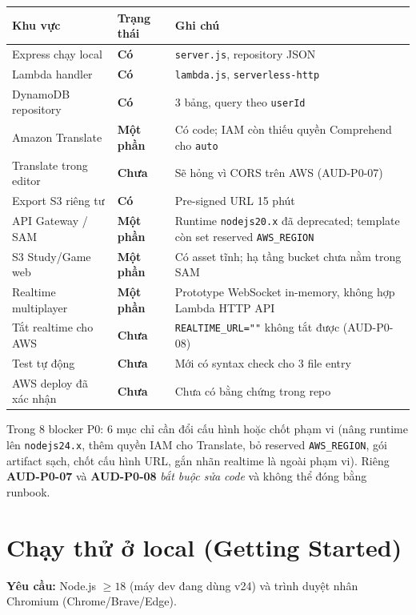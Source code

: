 \documentclass[11pt,a4paper]{article}
\newcommand{\code}[1]{\texttt{#1}}
\newcommand{\tagok}{\textcolor{ok}{\textbf{Có}}}
\newcommand{\tagno}{\textcolor{bad}{\textbf{Chưa}}}
\newcommand{\tagpart}{\textcolor{warn}{\textbf{Một phần}}}
\begin{document}
\begin{longtable}{@{}p{6.6cm} p{2.4cm} p{5.4cm}@{}}
\toprule
\textbf{Khu vực} & \textbf{Trạng thái} & \textbf{Ghi chú} \\
\midrule
\endhead
Express chạy local & \tagok & \code{server.js}, repository JSON \\
Lambda handler & \tagok & \code{lambda.js}, \code{serverless-http} \\
DynamoDB repository & \tagok & 3 bảng, query theo \code{userId} \\
Amazon Translate & \tagpart & Có code; IAM còn thiếu quyền Comprehend cho \code{auto} \\
Translate trong editor & \tagno & Sẽ hỏng vì CORS trên AWS (AUD-P0-07) \\
Export S3 riêng tư & \tagok & Pre-signed URL 15 phút \\
API Gateway / SAM & \tagpart & Runtime \code{nodejs20.x} đã deprecated; template còn set reserved \code{AWS_REGION} \\
S3 Study/Game web & \tagpart & Có asset tĩnh; hạ tầng bucket chưa nằm trong SAM \\
Realtime multiplayer & \tagpart & Prototype WebSocket in-memory, không hợp Lambda HTTP API \\
Tắt realtime cho AWS & \tagno & \code{REALTIME_URL=""} không tắt được (AUD-P0-08) \\
Test tự động & \tagno & Mới có syntax check cho 3 file entry \\
AWS deploy đã xác nhận & \tagno & Chưa có bằng chứng trong repo \\
\bottomrule
\end{longtable}

\begin{blocker}
Trong 8 blocker P0: 6 mục chỉ cần đổi cấu hình hoặc chốt phạm vi (nâng runtime lên
\code{nodejs24.x}, thêm quyền IAM cho Translate, bỏ reserved \code{AWS_REGION}, gói artifact sạch,
chốt cấu hình URL, gắn nhãn realtime là ngoài phạm vi). Riêng \textbf{AUD-P0-07} và
\textbf{AUD-P0-08} \emph{bắt buộc sửa code} và không thể đóng bằng runbook.
\end{blocker}

\section{Chạy thử ở local (Getting Started)}

\textbf{Yêu cầu:} Node.js $\ge 18$ (máy dev đang dùng v24) và trình duyệt nhân Chromium
(Chrome/Brave/Edge).
\end{document}
